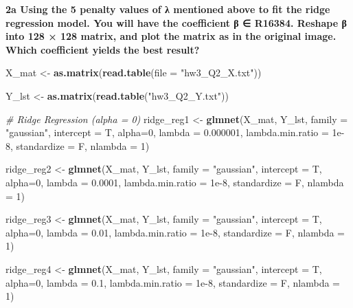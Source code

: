 \documentclass[
]{article}
\newenvironment{Shaded}{\begin{snugshade}}{\end{snugshade}}
\newcommand{\CommentTok}[1]{\textcolor[rgb]{0.56,0.35,0.01}{\textit{#1}}}
\newcommand{\DataTypeTok}[1]{\textcolor[rgb]{0.13,0.29,0.53}{#1}}
\newcommand{\DecValTok}[1]{\textcolor[rgb]{0.00,0.00,0.81}{#1}}
\newcommand{\FloatTok}[1]{\textcolor[rgb]{0.00,0.00,0.81}{#1}}
\newcommand{\KeywordTok}[1]{\textcolor[rgb]{0.13,0.29,0.53}{\textbf{#1}}}
\newcommand{\NormalTok}[1]{#1}
\newcommand{\StringTok}[1]{\textcolor[rgb]{0.31,0.60,0.02}{#1}}
\begin{document}
\textbf{2a Using the 5 penalty values of λ mentioned above to fit the
ridge regression model. You will have the coefficient β ∈ R16384.
Reshape β into 128 × 128 matrix, and plot the matrix as in the original
image. Which coefficient yields the best result?}

\begin{Shaded}
\begin{Highlighting}[]
\NormalTok{X_mat <-}\StringTok{ }\KeywordTok{as.matrix}\NormalTok{(}\KeywordTok{read.table}\NormalTok{(}\DataTypeTok{file =} \StringTok{"hw3_Q2_X.txt"}\NormalTok{))}

\NormalTok{Y_lst <-}\StringTok{ }\KeywordTok{as.matrix}\NormalTok{(}\KeywordTok{read.table}\NormalTok{(}\StringTok{"hw3_Q2_Y.txt"}\NormalTok{))}

\CommentTok{# Ridge Regression (alpha = 0)}
\NormalTok{ridge_reg1 <-}\StringTok{ }\KeywordTok{glmnet}\NormalTok{(X_mat, Y_lst, }\DataTypeTok{family =} \StringTok{"gaussian"}\NormalTok{, }\DataTypeTok{intercept =}\NormalTok{ T,}
\DataTypeTok{alpha=}\DecValTok{0}\NormalTok{, }\DataTypeTok{lambda =} \FloatTok{0.000001}\NormalTok{, }\DataTypeTok{lambda.min.ratio =} \FloatTok{1e-8}\NormalTok{,}
\DataTypeTok{standardize =}\NormalTok{ F, }\DataTypeTok{nlambda =} \DecValTok{1}\NormalTok{)}

\NormalTok{ridge_reg2 <-}\StringTok{ }\KeywordTok{glmnet}\NormalTok{(X_mat, Y_lst, }\DataTypeTok{family =} \StringTok{"gaussian"}\NormalTok{, }\DataTypeTok{intercept =}\NormalTok{ T,}
\DataTypeTok{alpha=}\DecValTok{0}\NormalTok{, }\DataTypeTok{lambda =} \FloatTok{0.0001}\NormalTok{, }\DataTypeTok{lambda.min.ratio =} \FloatTok{1e-8}\NormalTok{,}
\DataTypeTok{standardize =}\NormalTok{ F, }\DataTypeTok{nlambda =} \DecValTok{1}\NormalTok{)}

\NormalTok{ridge_reg3 <-}\StringTok{ }\KeywordTok{glmnet}\NormalTok{(X_mat, Y_lst, }\DataTypeTok{family =} \StringTok{"gaussian"}\NormalTok{, }\DataTypeTok{intercept =}\NormalTok{ T,}
\DataTypeTok{alpha=}\DecValTok{0}\NormalTok{, }\DataTypeTok{lambda =} \FloatTok{0.01}\NormalTok{, }\DataTypeTok{lambda.min.ratio =} \FloatTok{1e-8}\NormalTok{,}
\DataTypeTok{standardize =}\NormalTok{ F, }\DataTypeTok{nlambda =} \DecValTok{1}\NormalTok{)}

\NormalTok{ridge_reg4 <-}\StringTok{ }\KeywordTok{glmnet}\NormalTok{(X_mat, Y_lst, }\DataTypeTok{family =} \StringTok{"gaussian"}\NormalTok{, }\DataTypeTok{intercept =}\NormalTok{ T,}
\DataTypeTok{alpha=}\DecValTok{0}\NormalTok{, }\DataTypeTok{lambda =} \FloatTok{0.1}\NormalTok{, }\DataTypeTok{lambda.min.ratio =} \FloatTok{1e-8}\NormalTok{,}
\DataTypeTok{standardize =}\NormalTok{ F, }\DataTypeTok{nlambda =} \DecValTok{1}\NormalTok{)}


\end{Highlighting}
\end{Shaded}
\end{document}
